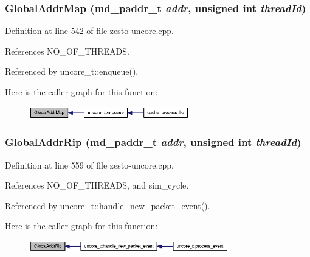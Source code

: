 \subsubsection[{GlobalAddrMap}]{ GlobalAddrMap ({\bf md\_\-paddr\_\-t} {\em addr}, \/  unsigned int {\em threadId})}\label{zesto-uncore_8cpp_01cc740447ec53a2bbde0097114061b6}




Definition at line 542 of file zesto-uncore.cpp.

References NO\_\-OF\_\-THREADS.

Referenced by uncore\_\-t::enqueue().

Here is the caller graph for this function:\nopagebreak
\begin{figure}[H]
\begin{center}
\leavevmode
\includegraphics[width=197pt]{zesto-uncore_8cpp_01cc740447ec53a2bbde0097114061b6_icgraph}
\end{center}
\end{figure}
\subsubsection[{GlobalAddrRip}]{ GlobalAddrRip ({\bf md\_\-paddr\_\-t} {\em addr}, \/  unsigned int {\em threadId})}\label{zesto-uncore_8cpp_3d080069c9391941da4853decf075b0b}




Definition at line 559 of file zesto-uncore.cpp.

References NO\_\-OF\_\-THREADS, and sim\_\-cycle.

Referenced by uncore\_\-t::handle\_\-new\_\-packet\_\-event().

Here is the caller graph for this function:\nopagebreak
\begin{figure}[H]
\begin{center}
\leavevmode
\includegraphics[width=246pt]{zesto-uncore_8cpp_3d080069c9391941da4853decf075b0b_icgraph}
\end{center}
\end{figure}
